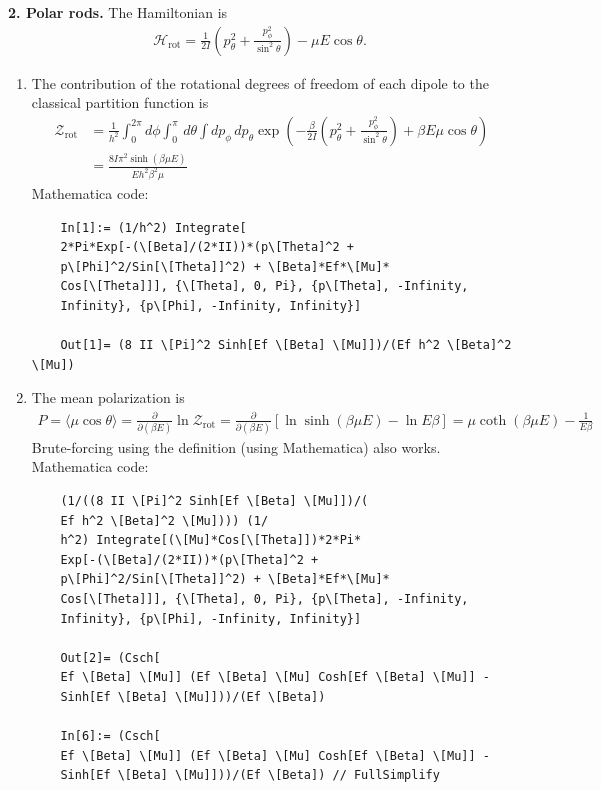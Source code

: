 \documentclass{article}
\theoremstyle{definition}
\newcommand{\p}{\partial}
\newcommand{\ham}{\mathcal{H}}
\newcommand{\be}{\beta}
\newcommand{\f}[2]{\frac{#1}{#2}}
\newcommand{\lp}{\left(}
\newcommand{\rp}{\right)}
\newcommand{\lb}{\left[}
\newcommand{\rb}{\right]}
\begin{document}
\noindent \textbf{2. Polar rods.} The Hamiltonian is 
\begin{align*}
\ham_\text{rot} = \f{1}{2I}\lp p_\theta^2 + \f{p_\phi^2}{\sin^2\theta} \rp - \mu E \cos\theta. 
\end{align*}

\begin{enumerate}[label=(\alph*)]
	
	
	\item The contribution of the rotational degrees of freedom of each dipole to the
	classical partition function is 
	\begin{align*}
	\mathcal{Z}_\text{rot} 
	&= \f{1}{h^2}\int^{2\pi}_0 d\phi \int^\pi_0 \,d\theta \int dp_\phi\,dp_\theta \exp\lp -\f{\be}{2I} \lp p^2_\theta + \f{p_\phi^2}{\sin^2\theta}\rp + \be E\mu\cos\theta\rp\\
	&= \boxed{\f{8I\pi^2\sinh(\be\mu E)}{Eh^2\be^2 \mu}}
 	\end{align*}
 	Mathematica code:
 	\begin{lstlisting}
 	In[1]:= (1/h^2) Integrate[
 	2*Pi*Exp[-(\[Beta]/(2*II))*(p\[Theta]^2 + 
 	p\[Phi]^2/Sin[\[Theta]]^2) + \[Beta]*Ef*\[Mu]*
 	Cos[\[Theta]]], {\[Theta], 0, Pi}, {p\[Theta], -Infinity, 
 	Infinity}, {p\[Phi], -Infinity, Infinity}]
 	
 	Out[1]= (8 II \[Pi]^2 Sinh[Ef \[Beta] \[Mu]])/(Ef h^2 \[Beta]^2 \[Mu])
 	\end{lstlisting}
	
	\item The mean polarization is 
	\begin{align*}
	P = \langle \mu \cos\theta \rangle = \f{\p}{\p (\be E)}\ln \mathcal{Z}_\text{rot} = \f{\p}{\p (\be E)}\lb \ln \sinh(\be \mu E) - \ln E\be \rb = \boxed{\mu \coth(\be \mu E) - \f{1}{E\be}}
	\end{align*}
	Brute-forcing using the definition (using Mathematica) also works. Mathematica code:
	\begin{lstlisting}
	(1/((8 II \[Pi]^2 Sinh[Ef \[Beta] \[Mu]])/(
	Ef h^2 \[Beta]^2 \[Mu]))) (1/
	h^2) Integrate[(\[Mu]*Cos[\[Theta]])*2*Pi*
	Exp[-(\[Beta]/(2*II))*(p\[Theta]^2 + 
	p\[Phi]^2/Sin[\[Theta]]^2) + \[Beta]*Ef*\[Mu]*
	Cos[\[Theta]]], {\[Theta], 0, Pi}, {p\[Theta], -Infinity, 
	Infinity}, {p\[Phi], -Infinity, Infinity}]
	
	Out[2]= (Csch[
	Ef \[Beta] \[Mu]] (Ef \[Beta] \[Mu] Cosh[Ef \[Beta] \[Mu]] - 
	Sinh[Ef \[Beta] \[Mu]]))/(Ef \[Beta])
	
	In[6]:= (Csch[
	Ef \[Beta] \[Mu]] (Ef \[Beta] \[Mu] Cosh[Ef \[Beta] \[Mu]] - 
	Sinh[Ef \[Beta] \[Mu]]))/(Ef \[Beta]) // FullSimplify
	

\end{lstlisting}
\end{enumerate}
\end{document}
